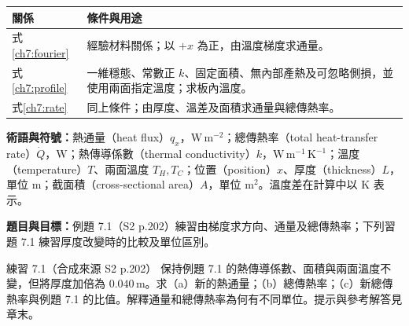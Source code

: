 \begin{center}\begin{tabular}{p{.23\linewidth}p{.68\linewidth}}\toprule
關係 & 條件與用途\\\midrule
式\eqref{ch7:fourier} & 經驗材料關係；以 $+x$ 為正，由溫度梯度求通量。\\
式\eqref{ch7:profile} & 一維穩態、常數正 $k$、固定面積、無內部產熱及可忽略側損，並使用兩面指定溫度；求板內溫度。\\
式\eqref{ch7:rate} & 同上條件；由厚度、溫差及面積求通量與總傳熱率。\\\bottomrule\end{tabular}\end{center}
\textbf{術語與符號：}熱通量（heat flux）$q_x$，$\mathrm{W\,m^{-2}}$；總傳熱率（total heat-transfer rate）$\dot Q$，$\mathrm W$；熱傳導係數（thermal conductivity）$k$，$\mathrm{W\,m^{-1}\,K^{-1}}$；溫度（temperature）$T$、兩面溫度 $T_H,T_C$；位置（position）$x$、厚度（thickness）$L$，單位 m；截面積（cross-sectional area）$A$，單位 $\mathrm{m^2}$。溫度差在計算中以 K 表示。

\textbf{題目與目標：}例題 7.1（S2 p.202）練習由梯度求方向、通量及總傳熱率；下列習題 7.1 練習厚度改變時的比較及單位區別。

\begin{selftestbox}{練習 7.1（合成來源 S2 p.202）}
保持例題 7.1 的熱傳導係數、面積與兩面溫度不變，但將厚度加倍為 $0.040\,\mathrm m$。求（a）新的熱通量；（b）總傳熱率；（c）新總傳熱率與例題 7.1 的比值。解釋通量和總傳熱率為何有不同單位。提示與參考解答見章末。
\end{selftestbox}
